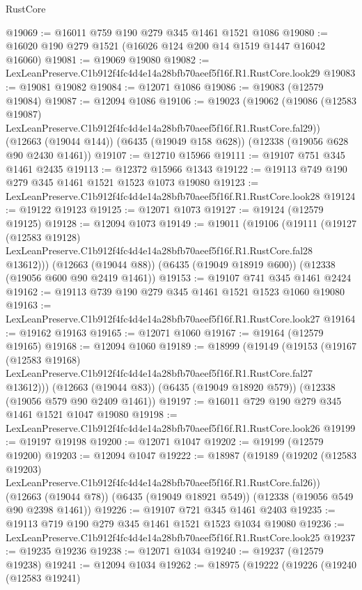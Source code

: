 \begin{lexlean}{RustCore}
\begin{coremodule}
@19069 := @16011 @759 @190 @279 @345 @1461 @1521 @1086
@19080 := @16020 @190 @279 @1521 (@16026 @124 @200 @14 @1519 @1447 @16042 @16060)
@19081 := @19069 @19080
@19082 := LexLeanPreserve.C1b912f4fc4d4e14a28bfb70aeef5f16f.R1.RustCore.look29
@19083 := @19081 @19082
@19084 := @12071 @1086
@19086 := @19083 (@12579 @19084)
@19087 := @12094 @1086
@19106 := @19023
    (@19062
      (@19086 (@12583 @19087) LexLeanPreserve.C1b912f4fc4d4e14a28bfb70aeef5f16f.R1.RustCore.fal29))
    (@12663 (@19044 @144))
    (@6435 (@19049 @158 @628))
    (@12338 (@19056 @628 @90 @2430 @1461))
@19107 := @12710 @15966
@19111 := @19107 @751 @345 @1461 @2435
@19113 := @12372 @15966 @1343
@19122 := @19113 @749 @190 @279 @345 @1461 @1521 @1523 @1073 @19080
@19123 := LexLeanPreserve.C1b912f4fc4d4e14a28bfb70aeef5f16f.R1.RustCore.look28
@19124 := @19122 @19123
@19125 := @12071 @1073
@19127 := @19124 (@12579 @19125)
@19128 := @12094 @1073
@19149 := @19011
    (@19106
      (@19111
        (@19127
          (@12583 @19128)
          LexLeanPreserve.C1b912f4fc4d4e14a28bfb70aeef5f16f.R1.RustCore.fal28
          @13612)))
    (@12663 (@19044 @88))
    (@6435 (@19049 @18919 @600))
    (@12338 (@19056 @600 @90 @2419 @1461))
@19153 := @19107 @741 @345 @1461 @2424
@19162 := @19113 @739 @190 @279 @345 @1461 @1521 @1523 @1060 @19080
@19163 := LexLeanPreserve.C1b912f4fc4d4e14a28bfb70aeef5f16f.R1.RustCore.look27
@19164 := @19162 @19163
@19165 := @12071 @1060
@19167 := @19164 (@12579 @19165)
@19168 := @12094 @1060
@19189 := @18999
    (@19149
      (@19153
        (@19167
          (@12583 @19168)
          LexLeanPreserve.C1b912f4fc4d4e14a28bfb70aeef5f16f.R1.RustCore.fal27
          @13612)))
    (@12663 (@19044 @83))
    (@6435 (@19049 @18920 @579))
    (@12338 (@19056 @579 @90 @2409 @1461))
@19197 := @16011 @729 @190 @279 @345 @1461 @1521 @1047 @19080
@19198 := LexLeanPreserve.C1b912f4fc4d4e14a28bfb70aeef5f16f.R1.RustCore.look26
@19199 := @19197 @19198
@19200 := @12071 @1047
@19202 := @19199 (@12579 @19200)
@19203 := @12094 @1047
@19222 := @18987
    (@19189
      (@19202 (@12583 @19203) LexLeanPreserve.C1b912f4fc4d4e14a28bfb70aeef5f16f.R1.RustCore.fal26))
    (@12663 (@19044 @78))
    (@6435 (@19049 @18921 @549))
    (@12338 (@19056 @549 @90 @2398 @1461))
@19226 := @19107 @721 @345 @1461 @2403
@19235 := @19113 @719 @190 @279 @345 @1461 @1521 @1523 @1034 @19080
@19236 := LexLeanPreserve.C1b912f4fc4d4e14a28bfb70aeef5f16f.R1.RustCore.look25
@19237 := @19235 @19236
@19238 := @12071 @1034
@19240 := @19237 (@12579 @19238)
@19241 := @12094 @1034
@19262 := @18975
    (@19222
      (@19226
        (@19240
          (@12583 @19241)

\end{coremodule}
\end{lexlean}

